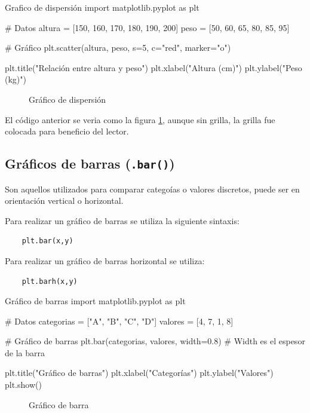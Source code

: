 \begin{pycode}{Grafico de dispersión}
import matplotlib.pyplot as plt

# Datos
altura = [150, 160, 170, 180, 190, 200]
peso = [50, 60, 65, 80, 85, 95]

# Gráfico
plt.scatter(altura, peso, s=5, c="red", marker="o")
    
plt.title("Relación entre altura y peso")
plt.xlabel("Altura (cm)")
plt.ylabel("Peso (kg)")
\end{pycode}

\begin{figure}[ht]
    \centering
     
    \caption{Gráfico de dispersión}
    \label{fig:grafico_simple_scatter}
\end{figure}

El código anterior se veria como la figura \ref{fig:grafico_simple_scatter}, aunque sin grilla, la grilla fue colocada para beneficio del lector.




\subsection{Gráficos de barras (\texttt{.bar()})}

Son aquellos utilizados para comparar categoías o valores discretos, puede ser en orientación vertical o horizontal.

Para realizar un gráfico de barras se utiliza la siguiente sintaxis:
\begin{verbatim}
    plt.bar(x,y)
\end{verbatim}

Para realizar un gráfico de barras horizontal se utiliza:
\begin{verbatim}
    plt.barh(x,y)
\end{verbatim}

\begin{pycode}{Gráfico de barras}
import matplotlib.pyplot as plt

# Datos
categorias = ["A", "B", "C", "D"]
valores = [4, 7, 1, 8]

# Gráfico de barras
plt.bar(categorias, valores, width=0.8) # Width es el espesor de la barra

plt.title("Gráfico de barras")
plt.xlabel("Categorías")
plt.ylabel("Valores")
plt.show()
\end{pycode}

\begin{figure}[ht]
    \centering
     
    \caption{Gráfico de barra}
    \label{fig:grafico_simple_bar}
\end{figure}

